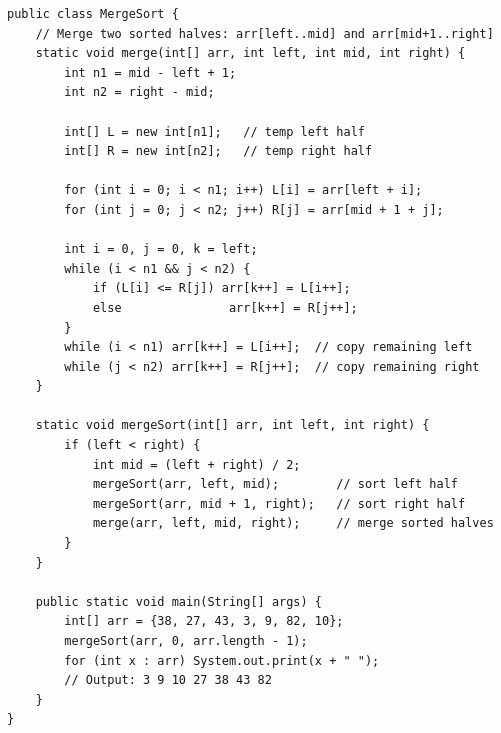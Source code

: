 \documentclass[12pt,a4paper,oneside]{book}
\begin{document}
\begin{lstlisting}[caption={Merge Sort --- stable O(n log n) guaranteed}]
public class MergeSort {
    // Merge two sorted halves: arr[left..mid] and arr[mid+1..right]
    static void merge(int[] arr, int left, int mid, int right) {
        int n1 = mid - left + 1;
        int n2 = right - mid;

        int[] L = new int[n1];   // temp left half
        int[] R = new int[n2];   // temp right half

        for (int i = 0; i < n1; i++) L[i] = arr[left + i];
        for (int j = 0; j < n2; j++) R[j] = arr[mid + 1 + j];

        int i = 0, j = 0, k = left;
        while (i < n1 && j < n2) {
            if (L[i] <= R[j]) arr[k++] = L[i++];
            else               arr[k++] = R[j++];
        }
        while (i < n1) arr[k++] = L[i++];  // copy remaining left
        while (j < n2) arr[k++] = R[j++];  // copy remaining right
    }

    static void mergeSort(int[] arr, int left, int right) {
        if (left < right) {
            int mid = (left + right) / 2;
            mergeSort(arr, left, mid);        // sort left half
            mergeSort(arr, mid + 1, right);   // sort right half
            merge(arr, left, mid, right);     // merge sorted halves
        }
    }

    public static void main(String[] args) {
        int[] arr = {38, 27, 43, 3, 9, 82, 10};
        mergeSort(arr, 0, arr.length - 1);
        for (int x : arr) System.out.print(x + " ");
        // Output: 3 9 10 27 38 43 82
    }
}
\end{lstlisting}
\end{document}
